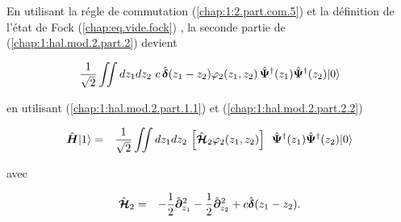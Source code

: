 En utilisant la régle de commutation (\ref{chap:1:2.part.com.5}) et la définition de l'état de Fock (\ref{chap:eq.vide.fock}) , la seconde partie de (\ref{chap:1:hal.mod.2.part.2}) devient

\begin{eqnarray}
	 \frac{1}{ \sqrt{2}}  \iint dz_1 dz_2 \,  \,c \, \hat{\bm{\delta}}(z_1 - z_2)  \varphi_2(z_1, z_2) \, \hat{\bm{\Psi}}^\dag(z_1) \hat{\bm{\Psi}}^\dag(z_2) \vert 0 \rangle \label{chap:1:hal.mod.2.part.2.2}	
\end{eqnarray} 

en utilisant (\ref{chap:1:hal.mod.2.part.1.1}) et (\ref{chap:1:hal.mod.2.part.2.2}) 


\begin{eqnarray}
	\operator{H}\vert 1 \rangle &= &  \frac{1}{ \sqrt{2}}  \iint dz_1 dz_2 \,  	\left [ \operator{\mathcal{H}}_2 \varphi_2(z_1, z_2) \right ] \, \operator{\Psi}^\dag(z_1) \operator{\Psi}^\dag(z_2) \vert 0 \rangle		
\end{eqnarray}

avec 

\begin{eqnarray}
	\hat{\bm{\mathcal{H}}}_2 & = &  - \frac{1}{2} \hat{\bm{\partial}}_{z_1}^2 - \frac{1}{2} \hat{\bm{\partial}}_{z_2}^2+ 	c  \hat{\bm{\delta}}(z_1 - z_2). \label{chap:1:hal.mod.2.part.3} 		
\end{eqnarray}
